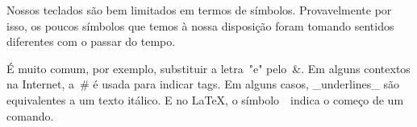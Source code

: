 \documentclass{article}
\begin{document}
Nossos teclados são bem limitados em termos de símbolos. Provavelmente por
isso, os poucos símbolos que temos à nossa disposição foram tomando sentidos
diferentes com o passar do tempo.

É muito comum, por exemplo, substituir a letra~"e" pelo~&. Em alguns contextos
na Internet, a~# é usada para indicar tags. Em alguns casos, _underlines_ são
equivalentes a um texto itálico. E no \LaTeX, o símbolo~\ indica o começo de um
comando.
\end{document}

